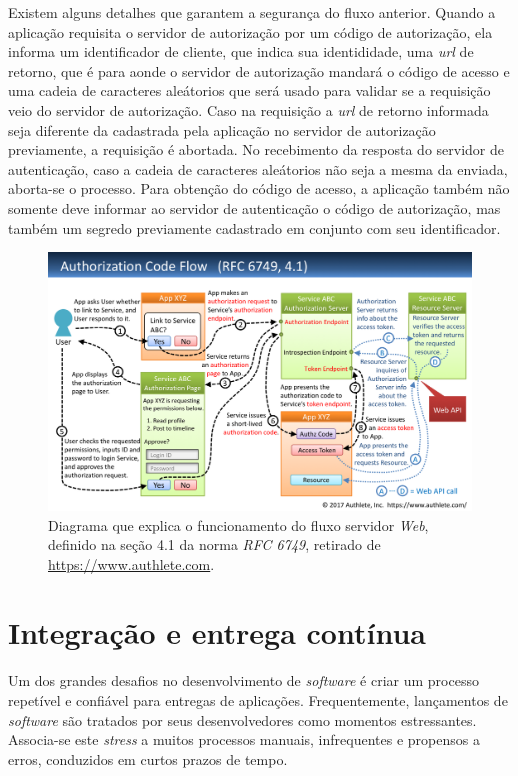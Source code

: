   Existem alguns detalhes que garantem a segurança do fluxo anterior. Quando a aplicação requisita 
  o servidor de autorização por um código de autorização, ela informa um identificador de cliente, que 
  indica sua identididade, uma \emph{url} de retorno, que é para aonde o servidor de autorização mandará 
  o código de acesso e uma cadeia de caracteres aleátorios que será usado para validar se a requisição 
  veio do servidor de autorização. Caso na requisição a \emph{url} de retorno informada seja diferente 
  da cadastrada pela aplicação no servidor de autorização previamente, a requisição é abortada. No 
  recebimento da resposta do servidor de autenticação, caso a cadeia de caracteres aleátorios não seja a mesma 
  da enviada, aborta-se o processo. Para obtenção do código de acesso, a aplicação também não somente deve informar 
  ao servidor de autenticação o código de autorização, mas também um segredo previamente cadastrado em conjunto 
  com seu identificador.
  \begin{figure}[htpb]
    \centering
    \includegraphics[width=0.95\linewidth]{images/web_flow.png}
    \caption{Diagrama que explica o funcionamento do fluxo servidor \emph{Web}, 
      definido na seção 4.1 da norma \emph{RFC 6749}, retirado de \url{https://www.authlete.com}.}%
    \label{fig:web_flow}
  \end{figure}
  

  \section{Integração e entrega contínua}
  Um dos grandes desafios no desenvolvimento de \emph{software} é criar um processo repetível e 
  confiável para entregas de aplicações. Frequentemente, lançamentos de \emph{software} são
  tratados por seus desenvolvedores como momentos estressantes. Associa-se este \emph{stress} a
  muitos processos manuais, infrequentes e propensos a erros, conduzidos em curtos prazos 
  de tempo.
  
